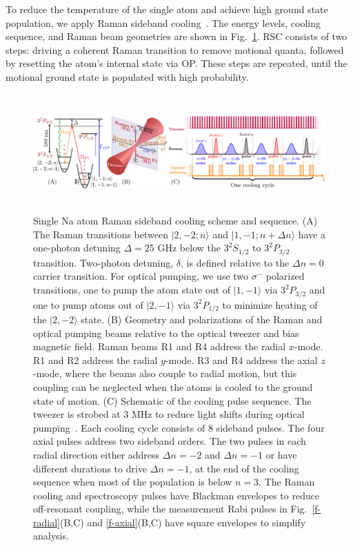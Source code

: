 \documentclass[aps,prl,twocolumn,groupedaddress]{revtex4-1}
\begin{document}
To  reduce the temperature of the single atom and
 achieve high ground state population, we apply Raman sideband cooling~\cite{Monroe1995, Kaufman2012}.
The  energy levels, cooling sequence, and Raman beam geometries
are shown in Fig.~\ref{f-setup}. RSC consists of two steps:
driving a coherent Raman transition  to remove motional quanta, followed by resetting the atom's internal state via OP.
These  steps are  repeated, until the motional ground state is populated with high probability.

\begin{figure}
  \includegraphics[height=4.5cm]{fig1_combined.pdf}
  \caption{Single Na atom Raman sideband cooling scheme and sequence. (A)
    The Raman transitions between $|2,-2;n\rangle$ and $|1,-1;n+\Delta n\rangle$ have a one-photon detuning $\Delta=25$ GHz below the $3^2S_{1/2}$ to $3^2P_{3/2}$ transition. Two-photon detuning, $\delta$, is defined relative to the $\Delta n=0$ carrier transition. For optical pumping, we use two $\sigma^-$ polarized transitions, one   to  pump the atom state out of $|1,-1\rangle$ via $3^2P_{3/2}$ and one  to pump atoms out of $|2,-1\rangle$ via $3^2P_{1/2}$
     to minimize heating of the $|2,-2\rangle$ state.
    (B) Geometry and polarizations of the Raman and optical pumping beams relative to the
    optical tweezer and bias magnetic field.  Raman beams R1 and R4 address the radial $x$-mode. R1 and R2 address the radial $y$-mode.  R3 and R4 address the axial $z$-mode, where the beams also couple to radial motion, but this coupling can be neglected when the atoms is cooled to the ground state of motion.  %
    (C) Schematic of the cooling pulse sequence. The tweezer is strobed at 3 MHz to
    reduce light shifts during optical pumping~\cite{Hutzler2017-LightShifts}.
    Each cooling cycle consists of $8$ sideband pulses.
    The four axial pulses address two sideband orders.
    The two pulses in each radial direction  either address $\Delta n=-2$ and $\Delta n=-1$
    or have different durations to drive $\Delta n=-1$, at the end of the cooling sequence when most of the population is below $n=3$.
    The Raman cooling and spectroscopy pulses have Blackman  envelopes to reduce  off-resonant
    coupling, while the measurement Rabi pulses in Fig.~\ref{f-radial}(B,C) and \ref{f-axial}(B,C) have square envelopes to simplify analysis.
    \label{f-setup}}
\end{figure}
\end{document}
